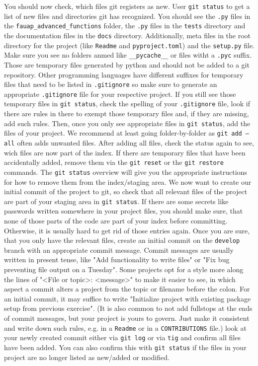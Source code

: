 \documentclass[]{erlangen-problemset}
\begin{document}
\begin{problem}[title={Setting up a git repository the simple way}]
\Question You should now check, which files git registers as new. User \texttt{git status} to get a list of new files and directories git has recognized. 
You should see the \texttt{.py} files in the \texttt{fauap\_advanced\_functions} folder, the \texttt{.py} files in the \texttt{tests} directory and the documentation files in the \texttt{docs} directory. 
Additionally, meta files in the root directory for the project (like \texttt{Readme} and \texttt{pyproject.toml}) and the \texttt{setup.py} file. 
Make sure you see no folders anmed like \texttt{__pycache__} or files witht a \texttt{.pyc} suffix. Those are temporary files generated by python and should not be added to a git repository. 
Other programming languages have different suffixes for temporary files that need to be listed in \texttt{.gitignore} so make sure to generate an appropriate \texttt{.gitignore} file for your respective project. 
If you still see those temporary files in \texttt{git status}, check the spelling of your \texttt{.gitignore} file, look if there are rules in there to exempt those temporary files and, if they are missing, add such rules. 
Then, once you only see appropriate files in \texttt{git status}, add the files of your project. 
We recommend at least going folder-by-folder as \texttt{git add --all} often adds unwanted files. 
After adding all files, check the status again to see, wich files are now part of the index. 
If there are temporary files that have been accidentally added, remove them via the \texttt{git reset} or the \texttt{git restore} commands. 
The \texttt{git status} overview will give you the appropriate instructions for how to remove them from the index/staging area. 
\Question We now want to create our initial commit of the project to git, so check that all relevant files of the project are part of your staging area in \texttt{git status}.
If there are some secrets like passwords written somewhere in your project files, you should make sure, that none of those parts of the code are part of your index before committing. 
Otherwise, it is usually hard to get rid of those entries again. 
Once you are sure, that you only have the relevant files, create an initial commit on the \texttt{develop} branch with an appropriate commit message. 
Commit messages are usually written in present tense, like "Add functionality to write files" or "Fix bug preventing file output on a Tuesday". 
Some projects opt for a style more along the lines of "<File or topic>: <message>" to make it easier to see, in which aspect a commit alters a project from the topic or filename before the colon. 
For an initial commit, it may suffice to write "Initialize project with existing package setup from previous exercise".
(It is also common to not add fullstops at the ends of commit messages, but your project is yours to govern. Just make it consistent and write down such rules, e.g. in a \texttt{Readme} or in a \texttt{CONTRIBUTIONS} file.)
\Question look at your newly created commit either via \texttt{git log} or via \texttt{tig} and confirm all files have been added. 
You can also confirm this with \texttt{git status} if the files in your project are no longer listed as new/added or modified.
\end{problem}
\end{document}
